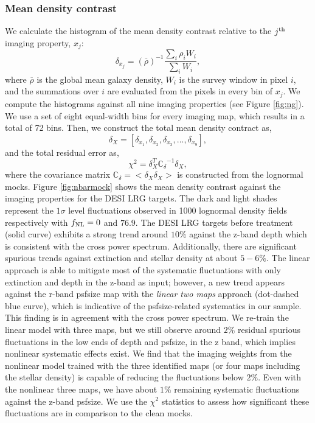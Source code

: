 \subsubsection{Mean density contrast}
We calculate the histogram of the mean density contrast relative to the $j^{\rm th}$ imaging property, $x_{j}$:
\begin{equation}
\delta_{x_{j}} = ({\overline{\rho}})^{-1} \frac{\sum_{i} \rho_{i} W_{i}}{\sum_{i} W_{i}},
\end{equation}
where $\overline{\rho}$ is the global mean galaxy density, $W_{i}$ is the survey window in pixel $i$, and the summations over $i$ are evaluated from the pixels in every bin of $x_{j}$. We compute the histograms against all nine imaging properties (see Figure \ref{fig:ng}). We use a set of eight equal-width bins for every imaging map, which results in a total of 72 bins. Then, we construct the total mean density contract as,
\begin{equation}
\delta_{X} = [\delta_{x_{1}}, \delta_{x_{2}}, \delta_{x_{3}}, ..., \delta_{x_{9}}],
\end{equation}
and the total residual error as,
\begin{equation}
\chi^{2} = \delta_{X}^{T} \mathbb{C_{\delta}}^{-1} \delta_{X},
\end{equation}
where the covariance matrix $\mathbb{C}_{\delta} = < \delta_{X} \delta_{X}>$ is constructed from the lognormal mocks. Figure \ref{fig:nbarmock} shows the mean density contrast against the imaging properties for the DESI LRG targets. The dark and light shades represent the $1\sigma$ level fluctuations observed in 1000 lognormal density fields respectively with $f_{\rm NL}=0$ and $76.9$. The DESI LRG targets before treatment (solid curve) exhibits a strong trend around $10\%$ against the z-band depth which is consistent with the cross power spectrum. Additionally, there are significant spurious trends against extinction and stellar density at about $5-6\%$. The linear approach is able to mitigate most of the systematic fluctuations with only extinction and depth in the z-band as input; however,  a new trend appears against the r-band psfsize map with the \textit{linear two maps} approach (dot-dashed blue curve), which is indicative of the psfsize-related systematics in our sample. This finding is in agreement with the cross power spectrum. We re-train the linear model with three maps, but we still observe around $2\%$ residual spurious fluctuations in the low ends of depth and psfsize, in the z band, which implies nonlinear systematic effects exist. We find that the imaging weights from the nonlinear model trained with the three identified maps (or four maps including the stellar density) is capable of reducing the fluctuations below $2\%$. Even with the nonlinear three maps, we have about $1\%$ remaining systematic fluctuations against the z-band psfsize. We use the $\chi^{2}$ statistics to assess how significant these fluctuations are in comparison to the clean mocks. 

